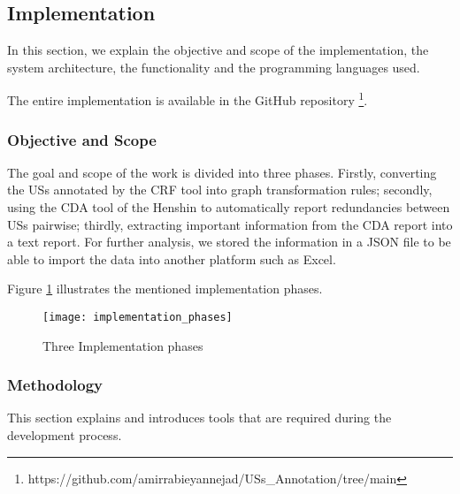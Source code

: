 \subsection{Implementation}\label{redundancy_implementation}
In this section, we explain the objective and scope of the implementation, the system architecture, the functionality and the programming languages used.

The entire implementation is available in the GitHub repository \footnote{https://github.com/amirrabieyannejad/USs\_Annotation/tree/main}.
\subsubsection*{Objective and Scope}
The goal and scope of the work is divided into three phases. Firstly, converting the USs annotated by the CRF tool into graph transformation rules; secondly, using the CDA tool of the Henshin to automatically report redundancies between USs pairwise; thirdly, extracting important information from the CDA report into a text report. For further analysis, we stored the information in a JSON file to be able to import the data into another platform such as Excel.

Figure \ref{fig:implementation_phases} illustrates the mentioned implementation phases.
\begin{figure}[h]
	\centering
	\texttt{[image: implementation\_phases]}
	\caption{Three Implementation phases}\label{fig:implementation_phases}
\end{figure} 
\subsubsection*{Methodology}
This section explains and introduces tools that are required during the development process.

